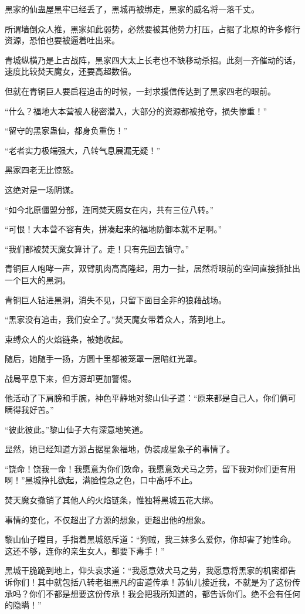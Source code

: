 \begin{this_body}
黑家的仙蛊屋黑牢已经丢了，黑城再被绑走，黑家的威名将一落千丈。

所谓墙倒众人推，黑家如此弱势，必然要被其他势力打压，占据了北原的许多修行资源，恐怕也要被逼着吐出来。

青城纵横乃是上古战阵，黑家四大太上长老也不缺移动杀招。此刻一齐催动的话，速度比较焚天魔女，还要高超数倍。

但就在青铜巨人要启程追击的时候，一封求援信传达到了黑家四老的眼前。

“什么？福地大本营被人秘密潜入，大部分的资源都被抢夺，损失惨重！”

“留守的黑家蛊仙，都身负重伤！”

“老者实力极端强大，八转气息展漏无疑！”

黑家四老无比惊怒。

这绝对是一场阴谋。

“如今北原僵盟分部，连同焚天魔女在内，共有三位八转。”

“可恨！大本营不容有失，拼凑起来的福地防御本就不足啊。”

“我们都被焚天魔女算计了。走！只有先回去镇守。”

青铜巨人咆哮一声，双臂肌肉高高隆起，用力一扯，居然将眼前的空间直接撕扯出一个巨大的黑洞。

青铜巨人钻进黑洞，消失不见，只留下面目全非的狼藉战场。

“黑家没有追击，我们安全了。”焚天魔女带着众人，落到地上。

束缚众人的火焰链条，被她收起。

随后，她随手一扬，方圆十里都被笼罩一层暗红光罩。

战局平息下来，但方源却更加警惕。

他活动了下肩膀和手腕，神色平静地对黎山仙子道：“原来都是自己人，你们俩可瞒得我好苦。”

“彼此彼此。”黎山仙子大有深意地笑道。

显然，她已经知道方源占据星象福地，伪装成星象子的事情了。

“饶命！饶我一命！我愿意为你们效命，我愿意效犬马之劳，留下我对你们更有用啊！”黑城挣扎欲起，满脸惶急之色，口中高呼不止。

焚天魔女撤销了其他人的火焰链条，惟独将黑城五花大绑。

事情的变化，不仅超出了方源的想象，更超出他的想象。

黎山仙子瞠目，手指着黑城怒斥道：“狗贼，我三妹多么爱你，你却害了她性命。这还不够，连你的亲生女人，都要下毒手！”

黑城干脆跪到地上，仰头哀求道：“我愿意效犬马之劳，我愿意将黑家的机密都告诉你们！其中就包括八转老祖黑凡的宙道传承！苏仙儿接近我，不就是为了这份传承吗？你们不都是想要这份传承！我会把我所知道的，都告诉你们。绝不会有任何的隐瞒！”


\end{this_body}

